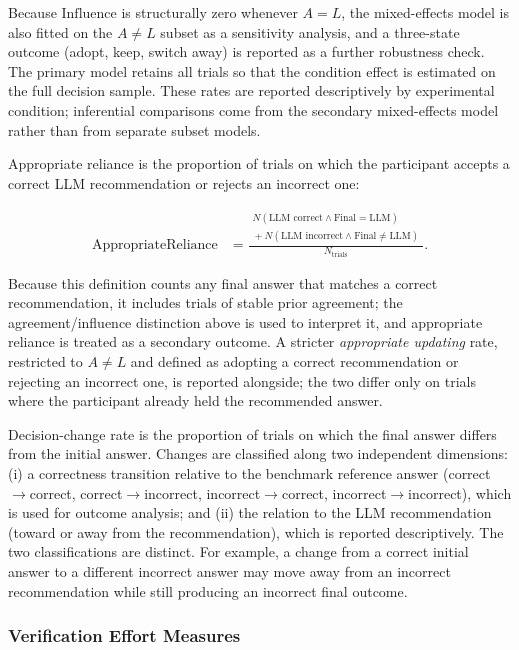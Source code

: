 \documentclass[oneside,final,14pt,a4paper]{extreport}
\begin{document}
Because $\text{Influence}$ is structurally zero whenever $A=L$, the
mixed-effects model is also fitted on the $A\neq L$ subset as a sensitivity
analysis, and a three-state outcome (adopt, keep, switch away) is reported as a
further robustness check. The primary model retains all trials so that the
condition effect is estimated on the full decision sample. These rates are
reported descriptively by experimental condition; inferential comparisons come
from the secondary mixed-effects model rather than from separate subset models.

Appropriate reliance is the proportion of trials on which the participant
accepts a correct LLM recommendation or rejects an incorrect one:

$$
\begin{aligned}
\text{AppropriateReliance}
&=
\frac{
\begin{gathered}
N(\text{LLM correct}\land\text{Final}=\text{LLM})\\
{}+N(\text{LLM incorrect}\land\text{Final}\neq\text{LLM})
\end{gathered}
}{
N_{\text{trials}}
}.
\end{aligned}
$$

Because this definition counts any final answer that matches a correct
recommendation, it includes trials of stable prior agreement; the
agreement/influence distinction above is used to interpret it, and appropriate
reliance is treated as a secondary outcome. A stricter \emph{appropriate
updating} rate, restricted to $A\neq L$ and defined as adopting a correct
recommendation or rejecting an incorrect one, is reported alongside; the two
differ only on trials where the participant already held the recommended
answer.

Decision-change rate is the proportion of trials on which the final answer
differs from the initial answer. Changes are classified along two independent
dimensions: (i) a correctness transition relative to the benchmark reference
answer (correct$\to$correct, correct$\to$incorrect, incorrect$\to$correct,
incorrect$\to$incorrect), which is used for outcome analysis; and (ii) the
relation to the LLM recommendation (toward or away from the recommendation),
which is reported descriptively. The two classifications are distinct. For
example, a change from a correct initial answer to a different incorrect
answer may move away from an incorrect recommendation while still producing
an incorrect final outcome.

\subsubsection{Verification Effort Measures}
\label{subsubsec:verification-burden}
\end{document}
